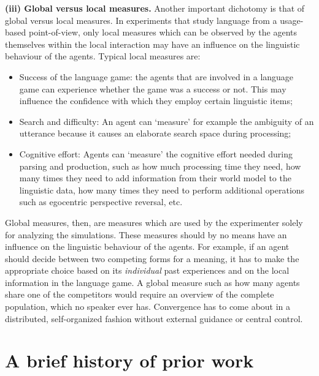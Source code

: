 {\bfseries (iii) Global versus local measures.}
Another important dichotomy is that of global versus local measures. In experiments that study language from a usage-based point-of-view, only local measures which can be observed by the agents themselves within the local interaction may have an influence on the linguistic behaviour of the agents. Typical local measures are:

\begin{itemize}
\item Success of the language game: the agents that are involved in a language game can experience whether the game was a success or not. This may influence the confidence with which they employ certain linguistic items;
\item Search and difficulty: An agent can `measure' for example the ambiguity of an utterance because it causes an elaborate search space during processing;
\item Cognitive effort: Agents can `measure' the cognitive effort needed during parsing and production, such as how much processing time they need, how many times they need to add information from their world model to the linguistic data, how many times they need to perform additional operations such as egocentric perspective reversal, etc.
\end{itemize}

Global measures, then, are measures which are used by the experimenter solely for analyzing the simulations. These measures should by no means have an influence on the linguistic behaviour of the agents. For example, if an agent should decide between two competing forms for a meaning, it has to make the appropriate choice based on its {\em individual} past experiences and on the local information in the language game. A global measure such as how many agents share one of the competitors would require an overview of the complete population, which no speaker ever has. Convergence has to come about in a distributed, self-organized fashion without external guidance or central control.

\section{A brief history of prior work}
\label{s:history-of-research}

